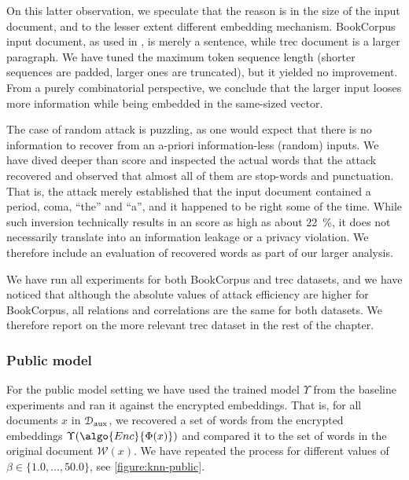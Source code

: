 				On this latter observation, we speculate that the reason is in the size of the input document, and to the lesser extent different embedding mechanism.
				BookCorpus input document, as used in \cite{embedding-attacks}, is merely a sentence, while \acrshort{trec} document is a larger paragraph.
				We have tuned the maximum token sequence length (shorter sequences are padded, larger ones are truncated), but it yielded no improvement.
				From a purely combinatorial perspective, we conclude that the larger input looses more information while being embedded in the same-sized vector.

				The case of random attack is puzzling, as one would expect that there is no information to recover from an a-priori information-less (random) inputs.
				We have dived deeper than \FOne{} score and inspected the actual words that the attack recovered and observed that almost all of them are stop-words and punctuation.
				That is, the attack merely established that the input document contained a period, coma, ``the'' and ``a'', and it happened to be right some of the time.
				While such inversion technically results in an \FOne{} score as high as about \SI{22}{\percent}, it does not necessarily translate into an information leakage or a privacy violation.
				We therefore include an evaluation of recovered words as part of our larger analysis.

				We have run all experiments for both BookCorpus and \acrshort{trec} datasets, and we have noticed that although the absolute values of attack efficiency are higher for BookCorpus, all relations and correlations are the same for both datasets.
				We therefore report on the more relevant \acrshort{trec} dataset in the rest of the chapter.

			\subsubsection{Public model}

				For the public model setting we have used the trained model $\Upsilon$ from the baseline experiments and ran it against the encrypted embeddings.
				That is, for all documents $x$ in $\mathcal{D}_\text{aux}$, we recovered a set of words from the encrypted embeddings $\Upsilon( \algo{Enc}{ \Phi(x) } )$ and compared it to the set of words in the original document $\mathcal{W}(x)$.
				We have repeated the process for different values of $\beta \in \{ 1.0, \ldots, 50.0 \}$, see \cref{figure:knn-public}.

